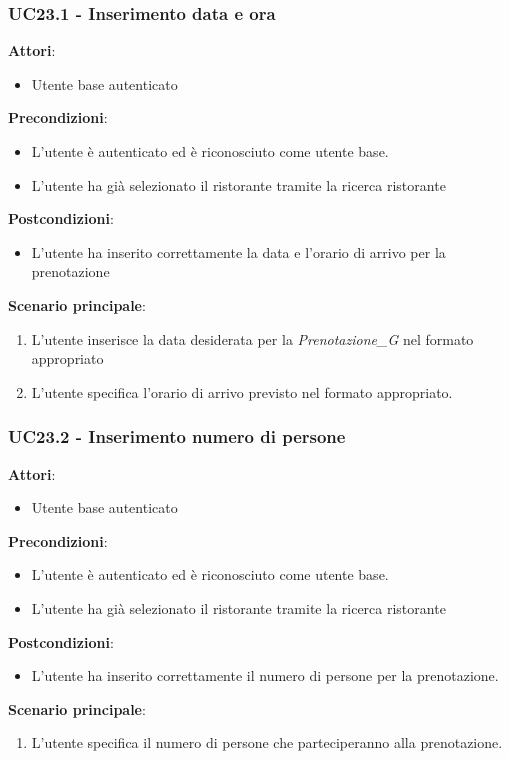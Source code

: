 \subsubsection{UC23.1 - Inserimento data e ora}\label{usecase:23_1}
\textbf{Attori}:
\begin{itemize}
    \item Utente base autenticato
\end{itemize}
\textbf{Precondizioni}:
\begin{itemize}
    \item L'utente è autenticato ed è riconosciuto come utente base.
    \item L'utente ha già selezionato il ristorante tramite la ricerca ristorante 
\end{itemize}
\textbf{Postcondizioni}:
\begin{itemize}
    \item L'utente ha inserito correttamente la data e l'orario di arrivo per la prenotazione
\end{itemize}
\textbf{Scenario principale}:
\begin{enumerate}
    \item L'utente inserisce la data desiderata per la \textit{Prenotazione_G} nel formato appropriato
    \item L'utente specifica l'orario di arrivo previsto nel formato appropriato.
\end{enumerate}



\subsubsection{UC23.2 - Inserimento numero di persone}\label{usecase:23_2}
\textbf{Attori}:
\begin{itemize}
    \item Utente base autenticato
\end{itemize}
\textbf{Precondizioni}:
\begin{itemize}
    \item L'utente è autenticato ed è riconosciuto come utente base.
    \item L'utente ha già selezionato il ristorante tramite la ricerca ristorante 
\end{itemize}
\textbf{Postcondizioni}:
\begin{itemize}
    \item L'utente ha inserito correttamente il numero di persone per la prenotazione.
\end{itemize}
\textbf{Scenario principale}:
\begin{enumerate}
    \item L'utente specifica il numero di persone che parteciperanno alla prenotazione.
\end{enumerate}


